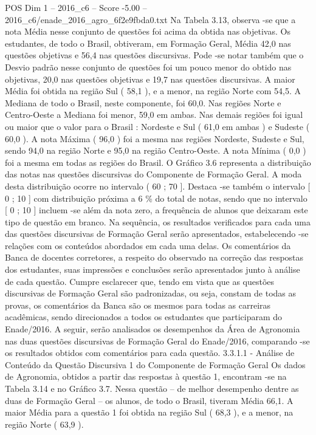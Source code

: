 \begin{textsample}{POS Dim 1 – 2016\_c6 – Score -5.00 – 2016\_c6/enade\_2016\_agro\_6f2e9fbda0.txt}
Na Tabela 3.13, observa -se que a nota Média nesse conjunto de questões foi acima da obtida nas objetivas.
Os estudantes, de todo o Brasil, obtiveram, em Formação Geral, Média 42,0 nas questões objetivas e 56,4 nas questões discursivas.
Pode -se notar também que o Desvio padrão nesse conjunto de questões foi um pouco menor do obtido nas objetivas, 20,0 nas questões objetivas e 19,7 nas questões discursivas.
A maior Média foi obtida na região Sul ( 58,1 ), e a menor, na região Norte com 54,5.
A Mediana de todo o Brasil, neste componente, foi 60,0.
Nas regiões Norte e Centro-Oeste a Mediana foi menor, 59,0 em ambas.
Nas demais regiões foi igual ou maior que o valor para o Brasil : Nordeste e Sul ( 61,0 em ambas ) e Sudeste ( 60,0 ).
A nota Máxima ( 96,0 ) foi a mesma nas regiões Nordeste, Sudeste e Sul, sendo 94,0 na região Norte e 95,0 na região Centro-Oeste.
A nota Mínima ( 0,0 ) foi a mesma em todas as regiões do Brasil.
O Gráfico 3.6 representa a distribuição das notas nas questões discursivas do Componente de Formação Geral.
A moda desta distribuição ocorre no intervalo ( 60 ; 70 ].
Destaca -se também o intervalo [ 0 ; 10 ] com distribuição próxima a 6 \% do total de notas, sendo que no intervalo [ 0 ; 10 ] incluem -se além da nota zero, a frequência de alunos que deixaram este tipo de questão em branco.
Na sequência, os resultados verificados para cada uma das questões discursivas de Formação Geral serão apresentados, estabelecendo -se relações com os conteúdos abordados em cada uma delas.
Os comentários da Banca de docentes corretores, a respeito do observado na correção das respostas dos estudantes, suas impressões e conclusões serão apresentados junto à análise de cada questão.
Cumpre esclarecer que, tendo em vista que as questões discursivas de Formação Geral são padronizadas, ou seja, constam de todas as provas, os comentários da Banca são os mesmos para todas as carreiras acadêmicas, sendo direcionados a todos os estudantes que participaram do Enade/2016.
A seguir, serão analisados os desempenhos da Área de Agronomia nas duas questões discursivas de Formação Geral do Enade/2016, comparando -se os resultados obtidos com comentários para cada questão. 3.3.1.1 - Análise de Conteúdo da Questão Discursiva 1 do Componente de Formação Geral Os dados de Agronomia, obtidos a partir das respostas à questão 1, encontram -se na Tabela 3.14 e no Gráfico 3.7.
Nessa questão – de melhor desempenho dentre as duas de Formação Geral – os alunos, de todo o Brasil, tiveram Média 66,1.
A maior Média para a questão 1 foi obtida na região Sul ( 68,3 ), e a menor, na região Norte ( 63,9 ).

\end{textsample}
